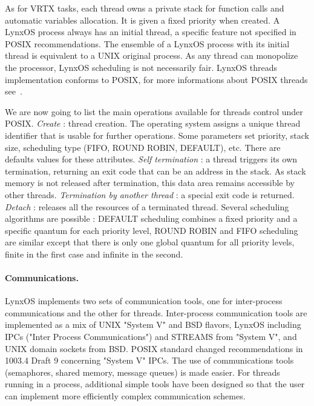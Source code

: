 \documentclass[10pt]{report}
\begin{document}
As for VRTX tasks, each thread owns a private stack for function calls and automatic variables allocation. It is given a fixed 
priority when created. A LynxOS process always has an initial thread, a specific feature not specified in POSIX recommendations.
The ensemble of a LynxOS process with its initial thread is equivalent to a UNIX original process. As any thread can
monopolize the processor, LynxOS scheduling is not necessarily fair. LynxOS threads implementation conforms to POSIX, for more 
informations about POSIX threads see~\cite{JMR:94}.

We are now going to list the main operations available for threads control under POSIX. {\em Create} : thread creation. 
The operating system assigns a unique thread identifier that is usable for further operations. Some parameters set priority, stack size,
scheduling type (FIFO, ROUND ROBIN, DEFAULT), etc. There are defaults values for these attributes. {\em Self termination} :
a thread triggers its own termination, returning an exit code that can be an address in the stack. As stack memory is not released after 
termination, this data area remains accessible by other threads. {\em Termination by another thread} : a special exit code is returned.
{\em Detach } : releases all the resources of a terminated thread. Several scheduling algorithms are possible : DEFAULT scheduling 
combines a fixed priority and a specific quantum for each priority level, ROUND ROBIN and FIFO scheduling are similar except that there 
is only one global quantum for all priority levels, finite in the first case and infinite in the second.

\paragraph{Communications.} LynxOS implements two sets of communication tools, one for inter-process communications and the other for 
threads. Inter-process communication tools are implemented as a mix of UNIX "System V" and BSD flavors, LynxOS including IPCs ("Inter
Process Communications") and STREAMS from "System V", and UNIX domain sockets from BSD. POSIX standard changed recommendations
in 1003.4 Draft 9 concerning "System V" IPCs. The use of communications tools (semaphores, shared memory, message queues) is made
easier. For threads running in a process, additional simple tools have been designed so that the user can implement more efficiently 
complex communication schemes.
\end{document}
